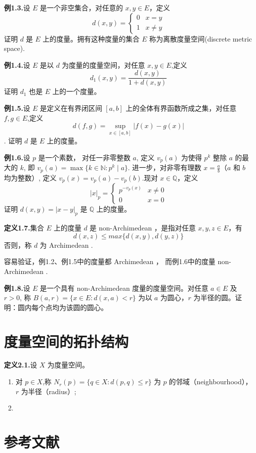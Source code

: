 \documentclass{article}
\begin{document}
\textbf{例1.3.}设 $E$ 是一个非空集合，对任意的 $x,y\in E$，定义
$$d(x,y) = \begin{cases} 0 & x=y \\ 1 & x\neq y \end{cases}$$
证明 $d$ 是 $E$ 上的度量。拥有这种度量的集合 $E$ 称为离散度量空间(discrete metric space).

\textbf{例1.4.}设 $E$ 是以 $d$ 为度量的度量空间，对任意 $x,y\in E$,定义
$$d_1(x,y) = \frac{d(x,y)}{1+d(x,y)}$$
证明 $d_1$ 也是 $E$ 上的一个度量。

\textbf{例1.5.}设 $E$ 是定义在有界闭区间 $[a,b]$ 上的全体有界函数所成之集，对任意 $f,g\in E$,定义
$$d(f,g) = \sup_{x\in [a,b]}|f(x)-g(x)|$$.
证明 $d$ 是 $E$ 上的度量。

\textbf{例1.6.}设 $p$ 是一个素数，
对任一非零整数 $a$,
定义 $v_p(a)$ 为使得 $p^k$ 整除 $a$ 的最大的 $k$,
即 $v_p(a) = \max\{k\in\mathbb{N}: p^k\mid a\}$.
进一步，对非零有理数 $x = \frac{a}{b}$（$a$ 和 $b$ 均为整数）,
定义 $v_p(x) = v_p(a) - v_p(b)$.现对 $x\in\mathbb{Q}$，定义
$$\vert x\vert_p = \begin{cases} p^{-v_p(x)} & x\neq 0 \\ 0 & x=0 \end{cases}$$
证明 $d(x,y) = \vert x-y\vert_p$ 是 $\mathbb{Q}$ 上的度量。

\textbf{定义1.7.}集合 $E$ 上的度量 $d$ 是 non-Archimedean ，是指对任意 $x,y,z\in E$，有
$$d(x,z) \leq max\{d(x,y),d(y,z)\}$$
否则，称 $d$ 为 Archimedean .

容易验证，例1.2、例1.5中的度量都 Archimedean ，
而例1.6中的度量 non-Archimedean .

\textbf{例1.8.}设 $E$ 是一个具有 non-Archimedean 度量的度量空间。对任意 $a\in E$ 及 $r>0$,
称 $B(a,r) = \{x\in E: d(x,a)<r\}$ 为以 $a$ 为圆心，$r$ 为半径的圆。证明：圆内每个点均为该圆的圆心。

\section{度量空间的拓扑结构}
\textbf{定义2.1.}设 $X$ 为度量空间。
\begin{enumerate}[label={\textbullet}]
    \item 对 $p\in X$,称 $N_r(p) = \{q\in X: d(p,q)\leq r\}$ 为 $p$ 的邻域（neighbourhood），$r$ 为半径（radius）;
    \item 
\end{enumerate}
\section*{参考文献} %
\end{document}
